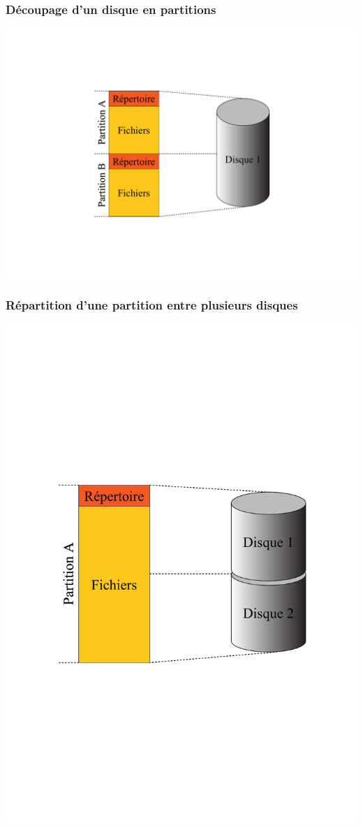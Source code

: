 \begin{frame}
\frametitle{Découpage d'un disque en partitions}
\includegraphics[height=.9\textheight]{../illustration/partition_2sur1.pdf}
\end{frame}

\begin{frame}
\frametitle{Répartition d'une partition entre plusieurs disques}
\includegraphics[height=.9\textheight]{../illustration/partition_1sur2.pdf}
\end{frame}


